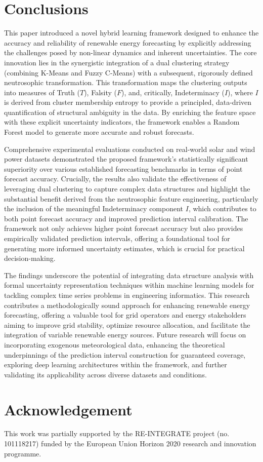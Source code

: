 \documentclass[review,3p,times]{elsarticle}
\begin{document}
\section{Conclusions}
\label{sec:conclusion_futurework}

This paper introduced a novel hybrid learning framework designed to enhance the accuracy and reliability of renewable energy forecasting by explicitly addressing the challenges posed by non-linear dynamics and inherent uncertainties. The core innovation lies in the synergistic integration of a dual clustering strategy (combining K-Means and Fuzzy C-Means) with a subsequent, rigorously defined neutrosophic transformation. This transformation maps the clustering outputs into measures of Truth ($T$), Falsity ($F$), and, critically, Indeterminacy ($I$), where $I$ is derived from cluster membership entropy to provide a principled, data-driven quantification of structural ambiguity in the data. By enriching the feature space with these explicit uncertainty indicators, the framework enables a Random Forest model to generate more accurate and robust forecasts.

Comprehensive experimental evaluations conducted on real-world solar and wind power datasets demonstrated the proposed framework's statistically significant superiority over various established forecasting benchmarks in terms of point forecast accuracy. Crucially, the results also validate the effectiveness of leveraging dual clustering to capture complex data structures and highlight the substantial benefit derived from the neutrosophic feature engineering, particularly the inclusion of the meaningful Indeterminacy component $I$, which contributes to both point forecast accuracy and improved prediction interval calibration. The framework not only achieves higher point forecast accuracy but also provides empirically validated prediction intervals, offering a foundational tool for generating more informed uncertainty estimates, which is crucial for practical decision-making.

The findings underscore the potential of integrating data structure analysis with formal uncertainty representation techniques within machine learning models for tackling complex time series problems in engineering informatics. This research contributes a methodologically sound approach for enhancing renewable energy forecasting, offering a valuable tool for grid operators and energy stakeholders aiming to improve grid stability, optimize resource allocation, and facilitate the integration of variable renewable energy sources. Future research will focus on incorporating exogenous meteorological data, enhancing the theoretical underpinnings of the prediction interval construction for guaranteed coverage, exploring deep learning architectures within the framework, and further validating its applicability across diverse datasets and conditions. \aiInline



\section*{Acknowledgement}
This work was partially supported by the  RE-INTEGRATE project (no. 101118217) funded by the European Union Horizon 2020 research and innovation programme.

\clearpage


\end{document}

